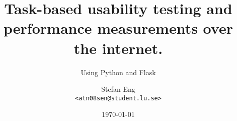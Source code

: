 \documentclass[10pt,aspectratio=1610]{beamer}
\begin{document}
\title[Usability testing over the internet] %
{Task-based usability testing and performance measurements over the internet.}

\subtitle{Using Python and Flask}

\author[Stefan Eng] %
{Stefan Eng \\\texttt{<atn08sen@student.lu.se>}}


\date[]{\today}


\frame{\titlepage}
\end{document}
